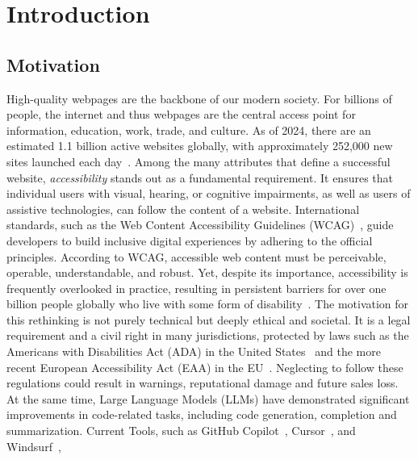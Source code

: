 
\chapter{Introduction}\label{chapter:introduction}

\section{Motivation}
High-quality webpages are the backbone of our modern society. 
For billions of people, the internet and thus webpages are the central access point 
for information, education, work, trade, and culture. 
As of 2024, there are an estimated 1.1 billion active websites 
globally, with approximately 252,000 new sites launched each
day~\cite{web:website}.\newline
Among the many attributes that define a successful website, \emph{accessibility} stands 
out as a fundamental requirement. It ensures that individual users
with visual, hearing, or cognitive
impairments, as well as users of assistive technologies, can follow the content
of a website.
International standards, such as the Web
Content Accessibility Guidelines (WCAG)~\cite{wcag21}, guide developers 
to build inclusive digital experiences by adhering to the official 
principles. According to WCAG, accessible web content must be 
perceivable, operable, understandable, and robust.
Yet, despite its importance, accessibility is frequently overlooked in
practice, resulting in persistent barriers for over one billion people globally who live with some
form of disability~\cite{web:disability}.\newline
The motivation for this rethinking is not purely technical but deeply ethical and societal. It is a
legal requirement and a civil right in many jurisdictions, protected by laws such as the Americans
with Disabilities Act (ADA) in the United States~\cite{web:ADA1990} and the more recent European Accessibility Act (EAA) in
the EU~\cite{web:EAA2019}. Neglecting to follow these regulations could result in warnings,
reputational damage and future sales loss.\newline
At the same time, Large Language Models (LLMs) have demonstrated significant     
improvements in code-related tasks, including code generation, completion and 
summarization. Current Tools, such as  GitHub Copilot~\cite{web:copilot}, 
Cursor~\cite{web:cursor}, and Windsurf~\cite{web:windsurf},
